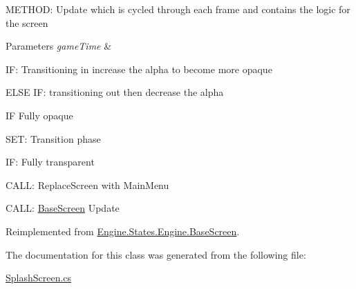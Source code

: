 M\+E\+T\+H\+OD\+: Update which is cycled through each frame and contains the logic for the screen 


\begin{DoxyParams}{Parameters}
{\em game\+Time} & \\
\hline
\end{DoxyParams}
IF\+: Transitioning in increase the alpha to become more opaque

E\+L\+SE IF\+: transitioning out then decrease the alpha

IF Fully opaque

S\+ET\+: Transition phase

IF\+: Fully transparent

C\+A\+LL\+: Replace\+Screen with Main\+Menu

C\+A\+LL\+: \hyperlink{a00550}{Base\+Screen} Update 

Reimplemented from \hyperlink{a00550_a098ece7d1e112475f6e880c3a672af64}{Engine.\+States.\+Engine.\+Base\+Screen}.



The documentation for this class was generated from the following file\+:\begin{DoxyCompactItemize}
\item 
\hyperlink{a00197}{Splash\+Screen.\+cs}\end{DoxyCompactItemize}
